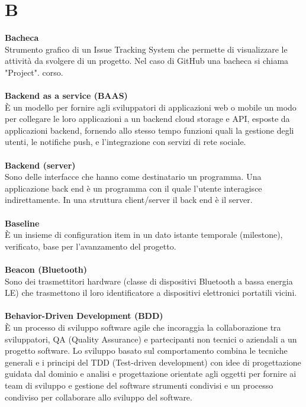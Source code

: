 \section{B}
\textbf{Bacheca}\\
Strumento grafico di un Issue Tracking System che permette di visualizzare le attività da svolgere di un progetto. Nel caso di GitHub una bacheca si chiama "Project".
corso.\\ \\
\textbf{Backend as a service (BAAS)}\\
È un modello per fornire agli sviluppatori di applicazioni web o mobile un modo per collegare le loro applicazioni a un backend cloud storage e API, esposte da applicazioni backend, fornendo allo stesso tempo funzioni quali la gestione degli utenti, le notifiche push, e l'integrazione con servizi di rete sociale. \\ \\
\textbf{Backend (server)}\\
Sono delle interfacce che hanno come destinatario un programma. Una applicazione back end è un programma con il quale l'utente interagisce indirettamente. In una struttura client/server il back end è il server. \\ \\
\textbf{Baseline}\\
È un insieme di configuration item in un dato istante temporale (milestone), verificato, base per l'avanzamento del progetto. \\ \\
\textbf{Beacon (Bluetooth)}\\
Sono dei trasmettitori hardware (classe di dispositivi Bluetooth a bassa energia LE) che trasmettono il loro identificatore a dispositivi elettronici portatili vicini. \\ \\
\textbf{Behavior-Driven Development (BDD)}\\
È un processo di sviluppo software agile che incoraggia la collaborazione tra sviluppatori, QA (Quality Assurance) e partecipanti non tecnici o aziendali a un progetto software. Lo sviluppo basato sul comportamento combina le tecniche generali e i principi del TDD (Test-driven development) con idee di progettazione guidata dal dominio e analisi e progettazione orientate agli oggetti per fornire ai team di sviluppo e gestione del software strumenti condivisi e un processo condiviso per collaborare allo sviluppo del software. \\ \\

